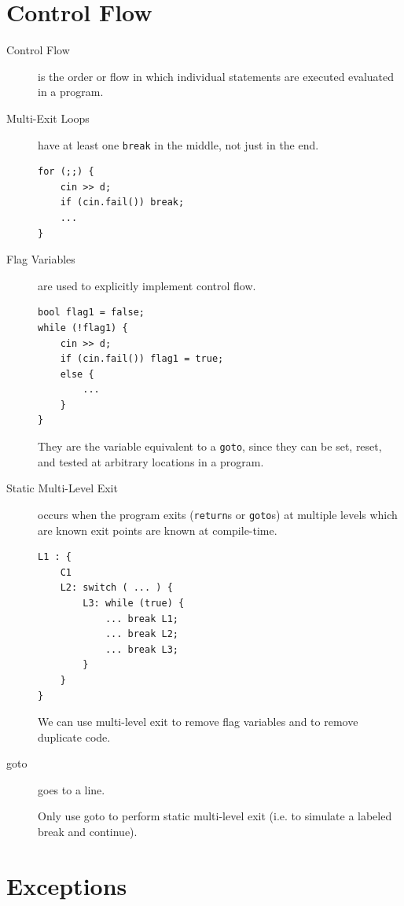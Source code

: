     \chapter{Control Flow} %
    \label{cha:control_flow}
        \begin{description}
            \item[Control Flow] is the order or flow in which individual statements are executed evaluated in a program.
            \item[Multi-Exit Loops] have at least one \verb|break| in the middle, not just in the end.
                \begin{lstlisting}
for (;;) {
    cin >> d;
    if (cin.fail()) break;
    ...
}
                \end{lstlisting}
            \item[Flag Variables] are used to explicitly implement control flow.
                \begin{lstlisting}
bool flag1 = false;
while (!flag1) {
    cin >> d;
    if (cin.fail()) flag1 = true;
    else {
        ...
    }
}
                \end{lstlisting}
                They are the variable equivalent to a \verb|goto|, since they can be set, reset, and tested at arbitrary locations in a program.
            \item[Static Multi-Level Exit] occurs when the program exits (\verb|return|s or \verb|goto|s) at multiple levels which are known exit points are known at compile-time.
                \begin{lstlisting}
L1 : {
    C1
    L2: switch ( ... ) {
        L3: while (true) {
            ... break L1;
            ... break L2;
            ... break L3;
        }
    }
}
                \end{lstlisting}
                We can use multi-level exit to remove flag variables and to remove duplicate code.
            \item[goto] goes to a line.

                Only use goto to perform static multi-level exit (i.e. to simulate a labeled break and continue).
        \end{description}
    \chapter{Exceptions} %
    \label{cha:exceptions}
